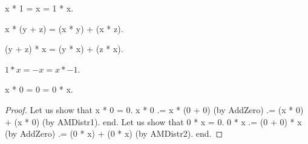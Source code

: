 \documentclass[a4paper,draft]{amsproc}
\begin{document}
\begin{forthel}
\begin{axiom}[MulUnit]
x * 1 = x = 1 * x.
\end{axiom}

\begin{axiom}[AMDistr1]
x * (y + z) = (x * y) + (x * z).
\end{axiom}

\begin{axiom}[AMDistr2]
(y + z) * x = (y * x) + (z * x).
\end{axiom}

\begin{axiom}[MulMnOne]
$1 * x = -x = x * -1$.
\end{axiom}

\begin{lemma}[MulZero]
x * 0 = 0 = 0 * x.
\end{lemma}
\begin{proof}
Let us show that x * 0 = 0.
x * 0 .= x * (0 + 0) (by AddZero) .= (x * 0) + (x * 0) (by AMDistr1).
end.
Let us show that 0 * x = 0.
0 * x .= (0 + 0) * x (by AddZero) .= (0 * x) + (0 * x) (by AMDistr2).
end.
\end{proof}
\end{forthel}
\end{document}
